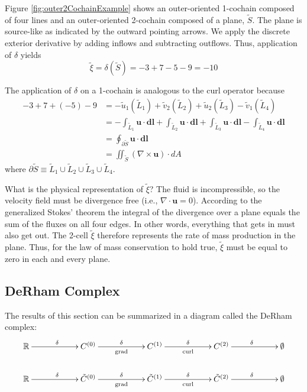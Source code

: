 Figure \ref{fig:outer2CochainExample} shows an outer-oriented 1-cochain composed of four lines and an outer-oriented 2-cochain composed of a plane, $\tilde{S}$. The plane is source-like as indicated by the outward pointing arrows. We apply the discrete exterior derivative by adding inflows and subtracting outflows. Thus, application of $\delta$ yields
\begin{equation}
    \tilde{\xi} = \delta(\tilde{S}) = -3 + 7 - 5 - 9 = -10
\end{equation}

The application of $\delta$ on a 1-cochain is analogous to the curl operator because
\begin{equation}
    \begin{split}
        -3 + 7 + (-5) - 9 &= -\tilde{u}_1(\tilde{L}_1) + \tilde{v}_2(\tilde{L}_2) + \tilde{u}_2(\tilde{L}_3) - \tilde{v}_1(\tilde{L}_4) \\
        &= -\int_{\tilde{L}_1} \mathbf{u} \cdot \mathbf{dl} + \int_{\tilde{L}_2} \mathbf{u} \cdot \mathbf{dl} + \int_{\tilde{L}_3} \mathbf{u} \cdot \mathbf{dl} - \int_{\tilde{L}_4} \mathbf{u} \cdot \mathbf{dl} \\
        &= \oint_{\partial \tilde{S}} \mathbf{u} \cdot \mathbf{dl} \\
        &= \iint_{\tilde{S}} \left( \nabla \times \mathbf{u} \right) \cdot dA
    \end{split}
    \label{eq:curlExample}
\end{equation}
where $\partial \tilde{S} \equiv \tilde{L}_1 \cup \tilde{L}_2 \cup \tilde{L}_3 \cup \tilde{L}_4$. 

What is the physical representation of $\tilde{\xi}$? The fluid is incompressible, so the velocity field must be divergence free (i.e., $\nabla \cdot \mathbf{u} = 0$). According to the generalized Stokes' theorem the integral of the divergence over a plane equals the sum of the fluxes on all four edges. In other words, everything that gets in must also get out. The 2-cell $\tilde{\xi}$ therefore represents the rate of mass production in the plane. Thus, for the law of mass conservation to hold true, $\tilde{\xi}$ must be equal to zero in each and every plane.

\subsection{DeRham Complex}

The results of this section can be summarized in a diagram called the DeRham complex:
\begin{equation}
    \begin{gathered}
        \xymatrix@C=13ex{
            \mathbb{R} \ar[r]^{\delta} & C^{(0)} \ar[r]^{\delta}_{\text{grad}} & C^{(1)} \ar[r]^{\delta}_{\text{curl}} & C^{(2)} \ar[r]^{\delta} & \emptyset \\
            \mathbb{R} \ar[r]^{\delta} & \tilde{C}^{(0)} \ar[r]^{\delta}_{\text{grad}} & \tilde{C}^{(1)} \ar[r]^{\delta}_{\text{curl}} & \tilde{C}^{(2)} \ar[r]^{\delta} & \emptyset
        }
    \end{gathered}
\end{equation}

